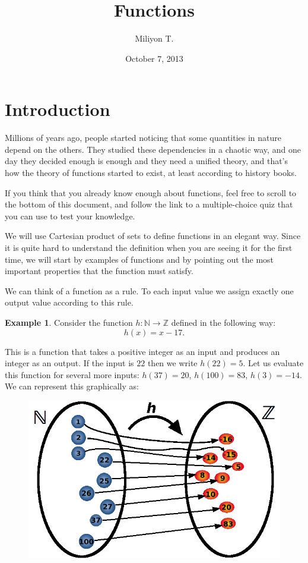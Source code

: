 \documentclass[11pt]{article}
\theoremstyle{definition}
\newtheorem{exmp}[thm]{Example}
\theoremstyle{plain}
\begin{document}
\nocite{}

\title{Functions}

\author{Miliyon T.}
\date{October 7, 2013}
\maketitle

\section{Introduction}

Millions of years ago, people started noticing that some quantities in nature depend on the others. They studied these dependencies in a chaotic way, and one day they decided enough is enough and they need a unified theory, and that's how the theory of functions started to exist, at least according to history books.

If you think that you already know enough about functions, feel free to scroll to the bottom of this document, and follow the link to a multiple-choice quiz that you can use to test your knowledge.

We will use Cartesian product of sets to define functions in an elegant way. Since it is quite hard to understand the definition when you are seeing it for the first time, we will start by examples of functions and by pointing out the most important properties that the function must satisfy.

We can think of a function as a rule. To each input value we assign exactly one output value according to this rule.

\begin{exmp}
Consider the function \( h:\mathbb N\to\mathbb Z \) defined in the following way: \[ h(x)=x-17.\]
\end{exmp}
This is a function that takes a positive integer as an input and produces an integer as an output. If the input is \( 22 \) then we write \( h(22)=5 \). Let us evaluate this function for several more inputs: \( h(37)=20 \), \( h(100)=83 \), \( h(3)=-14 \). We can represent this graphically as:

\begin{figure}[hbt!]
\centering
\includegraphics[width=.4\textwidth]{function}
\end{figure}
\end{document}
